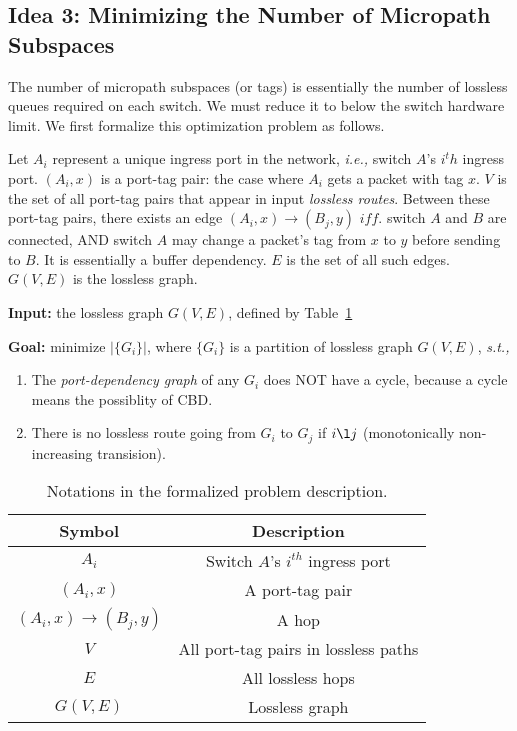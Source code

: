 \subsection{Idea 3: Minimizing the Number of Micropath Subspaces} 
The number of micropath subspaces (or tags) is essentially the number of lossless queues required on each switch.
We must reduce it to below the switch hardware limit. 
We first formalize this optimization problem as follows.

Let $A_i$ represent a unique ingress port in the network, {\em i.e.,} switch $A$'s $i^th$ ingress port.
$(A_i, x)$ is a port-tag pair: the case where $A_i$ gets a packet with tag $x$.
$V$ is the set of all port-tag pairs that appear in input {\em lossless routes}. 
Between these port-tag pairs, there exists an edge $(A_i, x)\rightarrow(B_j, y)$ $iff.$ switch $A$ and $B$ are 
connected, AND switch $A$ may change a packet's tag from $x$ to $y$ before sending to $B$.
It is essentially a buffer dependency.
$E$ is the set of all such edges. $G(V, E)$ is the lossless graph.


\textbf{Input:} the lossless graph $G(V, E)$, defined by Table~\ref{tab:symbols}

\textbf{Goal:} minimize $|\{G_i\}|$, where $\{G_i\}$ is a partition of lossless graph $G(V, E)$, {\em s.t.,}
\begin{enumerate}
\item The {\em port-dependency graph} of any $G_i$ does NOT have a cycle, because a cycle means the possiblity of CBD.
\item There is no lossless route going from $G_i$ to $G_j$ if $i \l j$ (monotonically non-increasing transision).
\end{enumerate}


\begin{table}
\small
\centering
\caption{Notations in the formalized problem description.}
\label{tab:symbols}
\begin{tabular}{|c|c|}
\hline
Symbol & Description \\ \hline
$A_i$ & Switch $A$'s $i^{th}$ ingress port  \\ \hline
$(A_i, x)$ & A port-tag pair \\ \hline
$(A_i, x)\rightarrow(B_j, y)$ & A hop \\ \hline
$V$ & All port-tag pairs in lossless paths  \\ \hline
$E$ & All lossless hops \\ \hline
$G(V, E)$ & Lossless graph \\ \hline
\end{tabular}
\end{table}


